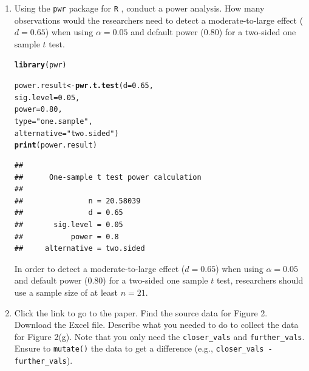 \documentclass{article}\usepackage[]{graphicx}\usepackage[]{xcolor}
\makeatletter
\newcommand{\hlnum}[1]{\textcolor[rgb]{0.686,0.059,0.569}{#1}}%
\newcommand{\hlsng}[1]{\textcolor[rgb]{0.192,0.494,0.8}{#1}}%
\newcommand{\hldef}[1]{\textcolor[rgb]{0.345,0.345,0.345}{#1}}%
\newcommand{\hlkwb}[1]{\textcolor[rgb]{0.69,0.353,0.396}{#1}}%
\newcommand{\hlkwc}[1]{\textcolor[rgb]{0.333,0.667,0.333}{#1}}%
\newcommand{\hlkwd}[1]{\textcolor[rgb]{0.737,0.353,0.396}{\textbf{#1}}}%
\newenvironment{kframe}{%
 \def\at@end@of@kframe{}%
 \ifinner\ifhmode%
  \def\at@end@of@kframe{\end{minipage}}%
  \begin{minipage}{\columnwidth}%
 \fi\fi%
 \def\FrameCommand##1{\hskip\@totalleftmargin \hskip-\fboxsep
 \colorbox{shadecolor}{##1}\hskip-\fboxsep
     \hskip-\linewidth \hskip-\@totalleftmargin \hskip\columnwidth}%
 \MakeFramed {\advance\hsize-\width
   \@totalleftmargin\z@ \linewidth\hsize
   \@setminipage}}%
 {\par\unskip\endMakeFramed%
 \at@end@of@kframe}
\newenvironment{knitrout}{}{} %
\makeatother
\begin{document}
\begin{enumerate}
\item Using the \texttt{pwr} package for \texttt{R} \citep{pwr},
conduct a power analysis. How many observations would the researchers 
need to detect a moderate-to-large effect ($d=0.65$) when using 
$\alpha=0.05$ and default power (0.80) for a two-sided one sample 
$t$ test.

\begin{knitrout}
\color{fgcolor}\begin{kframe}
\begin{alltt}
\hlkwd{library}\hldef{(pwr)}

\hldef{power.result} \hlkwb{<-} \hlkwd{pwr.t.test}\hldef{(}\hlkwc{d} \hldef{=} \hlnum{0.65}\hldef{,}
                           \hlkwc{sig.level} \hldef{=} \hlnum{0.05}\hldef{,}
                           \hlkwc{power} \hldef{=} \hlnum{0.80}\hldef{,}
                           \hlkwc{type} \hldef{=} \hlsng{"one.sample"}\hldef{,}
                           \hlkwc{alternative} \hldef{=} \hlsng{"two.sided"}\hldef{)}
\hlkwd{print}\hldef{(power.result)}
\end{alltt}
\begin{verbatim}
## 
##      One-sample t test power calculation 
## 
##               n = 20.58039
##               d = 0.65
##       sig.level = 0.05
##           power = 0.8
##     alternative = two.sided
\end{verbatim}
\end{kframe}
\end{knitrout}

In order to detect a moderate-to-large effect ($d=0.65$) when using 
$\alpha=0.05$ and default power (0.80) for a two-sided one sample 
$t$ test, researchers should use a sample size of at least $n=21$.

\item Click the link to go to the paper. Find the source data for 
Figure 2. Download the Excel file. Describe what you needed to
do to collect the data for Figure 2(g). Note that you only need the 
\texttt{closer\_vals} and \texttt{further\_vals}. Ensure to 
\texttt{mutate()} the data to get a difference 
(e.g., \texttt{closer\_vals - further\_vals}).


\end{enumerate}
\end{document}
